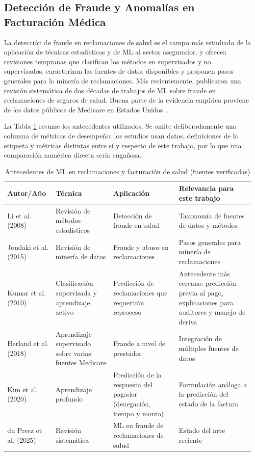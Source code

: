 \documentclass[12pt,letterpaper]{report}
\begin{document}
\subsection{Detección de Fraude y Anomalías en Facturación Médica}

La detección de fraude en reclamaciones de salud es el campo más estudiado de la aplicación de técnicas estadísticas y de ML al sector asegurador. \cite{li2008survey} y \cite{joudaki2015review} ofrecen revisiones tempranas que clasifican los métodos en supervisados y no supervisados, caracterizan las fuentes de datos disponibles y proponen pasos generales para la minería de reclamaciones. Más recientemente, \cite{dupreez2025fraud} publicaron una revisión sistemática de dos décadas de trabajos de ML sobre fraude en reclamaciones de seguros de salud. Buena parte de la evidencia empírica proviene de los datos públicos de Medicare en Estados Unidos \cite{herland2018bigdata, herland2020medicare}.

La Tabla \ref{tab:antecedentes_fraude} resume los antecedentes utilizados. Se omite deliberadamente una columna de métricas de desempeño: los estudios usan datos, definiciones de la etiqueta y métricas distintas entre sí y respecto de este trabajo, por lo que una comparación numérica directa sería engañosa.

\begin{table}[H]
\centering
\caption{Antecedentes de ML en reclamaciones y facturación de salud (fuentes verificadas)}
\label{tab:antecedentes_fraude}
\small
\begin{tabular}{@{}p{2.8cm}p{3.6cm}p{3.6cm}p{4.3cm}@{}}
\toprule
\textbf{Autor/Año} & \textbf{Técnica} & \textbf{Aplicación} & \textbf{Relevancia para este trabajo} \\
\midrule
Li et al. (2008) \cite{li2008survey} & Revisión de métodos estadísticos & Detección de fraude en salud & Taxonomía de fuentes de datos y métodos \\
Joudaki et al. (2015) \cite{joudaki2015review} & Revisión de minería de datos & Fraude y abuso en reclamaciones & Pasos generales para minería de reclamaciones \\
Kumar et al. (2010) \cite{kumar2010claims} & Clasificación supervisada y aprendizaje activo & Predicción de reclamaciones que requerirán reproceso & Antecedente más cercano: predicción previa al pago, explicaciones para auditores y manejo de deriva \\
Herland et al. (2018) \cite{herland2018bigdata} & Aprendizaje supervisado sobre varias fuentes Medicare & Fraude a nivel de prestador & Integración de múltiples fuentes de datos \\
Kim et al. (2020) \cite{kim2020deepclaim} & Aprendizaje profundo & Predicción de la respuesta del pagador (denegación, tiempo y monto) & Formulación análoga a la predicción del estado de la factura \\
du Preez et al. (2025) \cite{dupreez2025fraud} & Revisión sistemática & ML en fraude de reclamaciones de salud & Estado del arte reciente \\
\bottomrule
\end{tabular}
\end{table}
\end{document}
